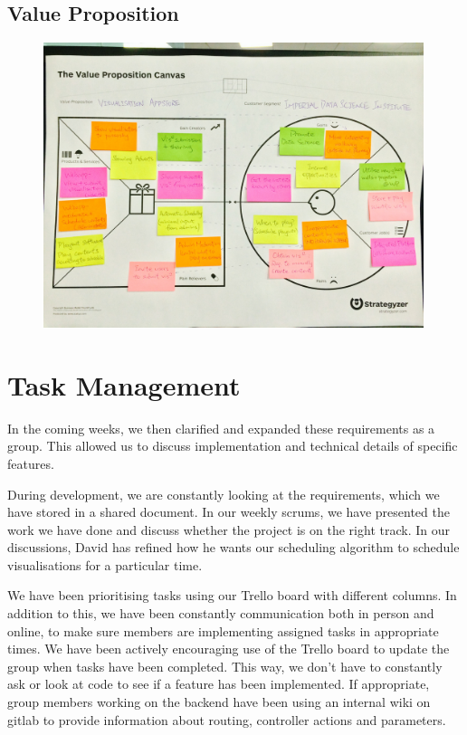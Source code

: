\documentclass[a4paper]{article}
\begin{document}
\subsection{Value Proposition}
\begin{figure}[H]
   \begin{center}
      \includegraphics[width = 0.99\textwidth, trim = 1cm 6.5cm 1cm 4.5cm, clip]{./evaluation/value_prop_canvas.jpg}

   \end{center}
\end{figure}



\section{Task Management}
In the coming weeks, we then clarified and expanded these requirements as 
a group. This allowed us to discuss implementation and technical details
of specific features.


During development, we are constantly looking at the requirements, which 
we have stored in a shared document. In our weekly scrums, we have 
presented the work we have done and discuss whether the project is on the 
right track. In our discussions, David has refined how he wants our
scheduling algorithm to schedule visualisations for a particular time. 



We have been prioritising tasks using our Trello board with different
columns. In addition to this, we have been constantly communication both 
in person and online, to make sure members are implementing assigned tasks
in appropriate times. We have been actively encouraging use of the Trello 
board to update the group when tasks have been completed. This way, 
we don't have to constantly ask or look at code to see if a feature has 
been implemented. If appropriate, group members working on the backend
have been using an internal wiki on gitlab to provide information about
routing, controller actions and parameters. 
\end{document}
